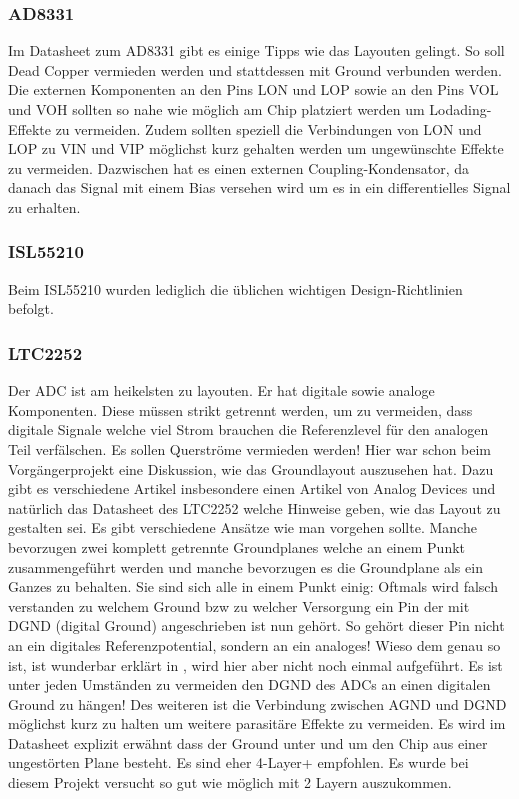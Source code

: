 \subsubsection*{AD8331}
Im Datasheet zum AD8331 gibt es einige Tipps wie das Layouten gelingt. So soll Dead Copper vermieden werden und stattdessen mit Ground verbunden werden.
Die externen Komponenten an den Pins LON und LOP sowie an den Pins VOL und VOH sollten so nahe wie möglich am Chip platziert werden um Lodading-Effekte zu vermeiden.
Zudem sollten speziell die Verbindungen von LON und LOP zu VIN und VIP möglichst kurz gehalten werden um ungewünschte Effekte zu vermeiden. Dazwischen hat es einen externen Coupling-Kondensator, da danach das Signal mit einem Bias versehen wird um es in ein differentielles Signal zu erhalten.

\subsubsection*{ISL55210}
Beim ISL55210 wurden lediglich die üblichen wichtigen Design-Richtlinien befolgt. 

\subsubsection*{LTC2252}
Der ADC ist am heikelsten zu layouten. Er hat digitale sowie analoge Komponenten. Diese müssen strikt getrennt werden, um zu vermeiden, dass digitale Signale welche viel Strom brauchen die Referenzlevel für den analogen Teil verfälschen. Es sollen Querströme vermieden werden!
Hier war schon beim Vorgängerprojekt eine Diskussion, wie das Groundlayout auszusehen hat. Dazu gibt es verschiedene Artikel insbesondere einen Artikel von Analog Devices \cite{StayingWellGrounded2012} und natürlich das Datasheet des LTC2252\cite{LTC2252} welche Hinweise geben, wie das Layout zu gestalten sei. Es gibt verschiedene Ansätze wie man vorgehen sollte. Manche bevorzugen zwei komplett getrennte Groundplanes welche an einem Punkt zusammengeführt werden und manche bevorzugen es die Groundplane als ein Ganzes zu behalten. Sie sind sich alle in einem Punkt einig: Oftmals wird falsch verstanden zu welchem Ground bzw zu welcher Versorgung ein Pin der mit DGND (digital Ground) angeschrieben ist nun gehört. So gehört dieser Pin nicht an ein digitales Referenzpotential, sondern an ein analoges! Wieso dem genau so ist, ist wunderbar erklärt in \cite{StayingWellGrounded2012}, wird hier aber nicht noch einmal aufgeführt.
Es ist unter jeden Umständen zu vermeiden den DGND des ADCs an einen digitalen Ground zu hängen! Des weiteren ist die Verbindung zwischen AGND und DGND möglichst kurz zu halten um weitere parasitäre Effekte zu vermeiden.
Es wird im Datasheet explizit erwähnt dass der Ground unter und um den Chip aus einer ungestörten Plane besteht. Es sind eher 4-Layer+ empfohlen. Es wurde bei diesem Projekt versucht so gut wie möglich mit 2 Layern auszukommen.

